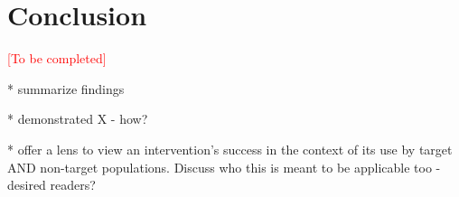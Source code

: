 \documentclass{sigchi}
\begin{document}









\section{Conclusion}
\textcolor{red}{[To be completed]}

* summarize findings 

* demonstrated X - how?

* offer a lens to view an intervention's success in the context of its use by target AND non-target populations. Discuss who this is meant to be applicable too - desired readers?
\balance



\end{document}
